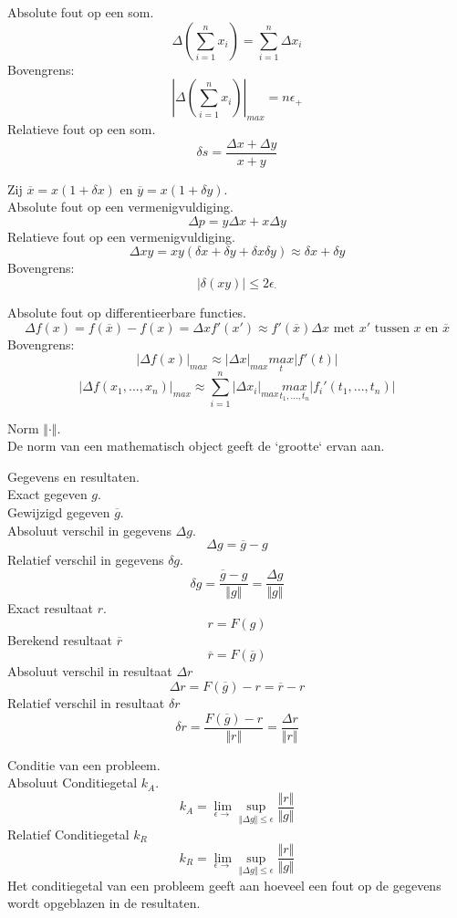 \documentclass[samenvatting.tex]{subfiles}
\begin{document}
\begin{defi}
Absolute fout op een som.
\[
\Delta\left(\sum_{i=1}^nx_i\right) = \sum_{i=1}^n\Delta x_i
\]
Bovengrens:
\[
\left|\Delta\left(\sum_{i=1}^nx_i\right)\right|_{max} = n\epsilon_{+}
\]
Relatieve fout op een som.
\[
\delta s = \frac{\Delta x + \Delta y}{x+y}
\]
\end{defi}
\begin{defi}
Zij $\overline{x} = x(1+\delta x)$ en $\overline{y} = x(1+\delta y)$.\\
Absolute fout op een vermenigvuldiging.
\[
\Delta p = y\Delta x + x\Delta y
\]
Relatieve fout op een vermenigvuldiging. 
\[
\Delta xy = xy(\delta x + \delta y + \delta x \delta y) \approx \delta x + \delta y
\]
Bovengrens:
\[
|\delta(xy)| \le 2\epsilon_{\cdot}
\]
\end{defi}
\begin{defi}
Absolute fout op differentieerbare functies.
\[
\Delta f(x) = f(\overline{x}) - f(x) = \Delta x f'(x') \approx f'(\overline{x})\Delta x\text{ met } x' \text{ tussen } x \text{ en }\overline{x}
\]
Bovengrens:
\[
|\Delta f(x)|_{max} \approx |\Delta x|_{max} \underset{t}{max}|f'(t)|
\]
\[
|\Delta f(x_1,...,x_n)|_{max} \approx \sum_{i=1}^n|\Delta x_i|_{max} \underset{t_1,...,t_n}{max}|f_i'(t_1,...,t_n)|
\]
\end{defi}
\begin{defi}
Norm $\Vert \cdot \Vert$.\\
De norm van een mathematisch object geeft de `grootte` ervan aan.
\end{defi}
\begin{defi} Gegevens en resultaten.\\
Exact gegeven $g$.\\
Gewijzigd gegeven $\overline{g}$.\\
Absoluut verschil in gegevens $\Delta g$.
\[
\Delta g = \overline{g} - g
\]
Relatief verschil in gegevens $\delta g$.
\[
\delta g
= \frac{\overline{g} - g}{\Vert g \Vert}
= \frac{\Delta g}{\Vert g \Vert}
\]
Exact resultaat $r$.
\[
r = F(g)
\]
Berekend resultaat $\overline{r}$
\[
\overline{r} = F(\overline{g})
\]
Absoluut verschil in resultaat $\Delta r$
\[
\Delta r
= F(\overline{g}) - r
= \overline{r} - r
\]
Relatief verschil in resultaat $\delta r$
\[
\delta r
= \frac{F(\overline{g}) - r}{\Vert r \Vert}
= \frac{\Delta r}{\Vert r \Vert}
\]
\end{defi}
\begin{defi}
Conditie van een probleem.\\
Absoluut Conditiegetal $k_A$.
\[
k_A =
\lim_{\epsilon \rightarrow}\sup_{\Vert \Delta g\Vert \le \epsilon} \frac{\Vert r\Vert}{\Vert g \Vert}
\]
Relatief Conditiegetal $k_R$
\[
k_R =
\lim_{\epsilon \rightarrow}\sup_{\Vert \Delta g\Vert \le \epsilon} \frac{\Vert r\Vert}{\Vert g \Vert}
\]
Het conditiegetal van een probleem geeft aan hoeveel een fout op de gegevens wordt opgeblazen in de resultaten.
\end{defi}
\end{document}
